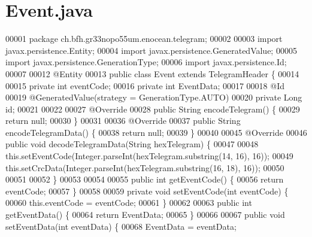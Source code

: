 \section{Event.\+java}
\label{Event_8java_source}

\begin{DoxyCode}
00001 \textcolor{keyword}{package }ch.bfh.gr33nopo55um.enocean.telegram;
00002 
00003 \textcolor{keyword}{import} javax.persistence.Entity;
00004 \textcolor{keyword}{import} javax.persistence.GeneratedValue;
00005 \textcolor{keyword}{import} javax.persistence.GenerationType;
00006 \textcolor{keyword}{import} javax.persistence.Id;
00007 
00012 @Entity
00013 \textcolor{keyword}{public} \textcolor{keyword}{class }Event \textcolor{keyword}{extends} TelegramHeader \{
00014 
00015     \textcolor{keyword}{private} \textcolor{keywordtype}{int} eventCode;
00016     \textcolor{keyword}{private} \textcolor{keywordtype}{int} EventData;
00017 
00018     @Id
00019     @GeneratedValue(strategy = GenerationType.AUTO)
00020     private Long \textcolor{keywordtype}{id};
00021 
00022 
00027     @Override
00028     public String encodeTelegram() \{
00029         \textcolor{keywordflow}{return} null;
00030     \}
00031 
00036     @Override
00037     \textcolor{keyword}{public} String encodeTelegramData() \{
00038         \textcolor{keywordflow}{return} null;
00039     \}
00040 
00045     @Override
00046     \textcolor{keyword}{public} \textcolor{keywordtype}{void} decodeTelegramData(String hexTelegram) \{
00047 
00048         this.setEventCode(Integer.parseInt(hexTelegram.substring(14, 16), 16));
00049         this.setCrcData(Integer.parseInt(hexTelegram.substring(16, 18), 16));
00050 
00051 
00052     \}
00053 
00054 
00055     \textcolor{keyword}{public} \textcolor{keywordtype}{int} getEventCode() \{
00056         \textcolor{keywordflow}{return} eventCode;
00057     \}
00058 
00059     \textcolor{keyword}{private} \textcolor{keywordtype}{void} setEventCode(\textcolor{keywordtype}{int} eventCode) \{
00060         this.eventCode = eventCode;
00061     \}
00062 
00063     \textcolor{keyword}{public} \textcolor{keywordtype}{int} getEventData() \{
00064         \textcolor{keywordflow}{return} EventData;
00065     \}
00066 
00067     \textcolor{keyword}{public} \textcolor{keywordtype}{void} setEventData(\textcolor{keywordtype}{int} eventData) \{
00068         EventData = eventData;

\end{DoxyCode}
